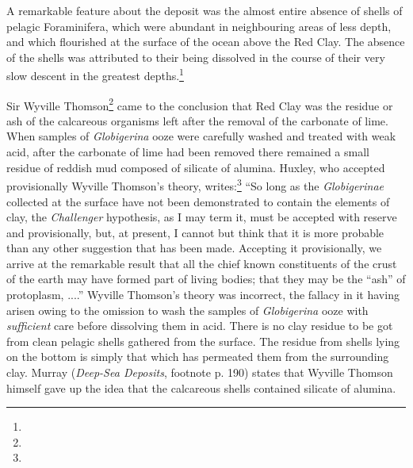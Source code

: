 \documentclass[a4paper, 12pt, oneside]{article}
\begin{document}
A remarkable feature about the deposit was the almost entire absence of shells of pelagic Foraminifera, which were abundant in neighbouring areas of less depth, and which flourished at the surface of the ocean above the Red Clay. The absence of the shells was attributed to their being dissolved in the course of their very slow descent in the greatest depths.\footnote{}

Sir Wyville Thomson\footnote{} came to the conclusion that Red Clay was the residue or ash of the calcareous organisms left after the removal of the carbonate of lime. When samples of \emph{Globigerina} ooze were carefully washed and treated with weak acid, after the carbonate of lime had been removed there remained a small residue of reddish mud composed of silicate of alumina. Huxley, who accepted provisionally Wyville Thomson's theory, writes:\footnote{} ``So long as the \emph{Globigerinae} collected at the surface have not been demonstrated to contain the elements of clay, the \emph{Challenger} hypothesis, as I may term it, must be accepted with reserve and provisionally, but, at present, I cannot but think that it is more probable than any other suggestion that has been made. Accepting it provisionally, we arrive at the remarkable result that all the chief known constituents of the crust of the earth may have formed part of living bodies; that they may be the ``ash'' of protoplasm, ....'' Wyville Thomson's theory was incorrect, the fallacy in it having arisen owing to the omission to wash the samples of \emph{Globigerina} ooze with \emph{sufficient} care before dissolving them in acid. There is no clay residue to be got from clean pelagic shells gathered from the surface. The residue from shells lying on the bottom is simply that which has permeated them from the surrounding clay. Murray (\emph{Deep-Sea Deposits}, footnote p. 190) states that Wyville Thomson himself gave up the idea that the calcareous shells contained silicate of alumina.
\end{document}
